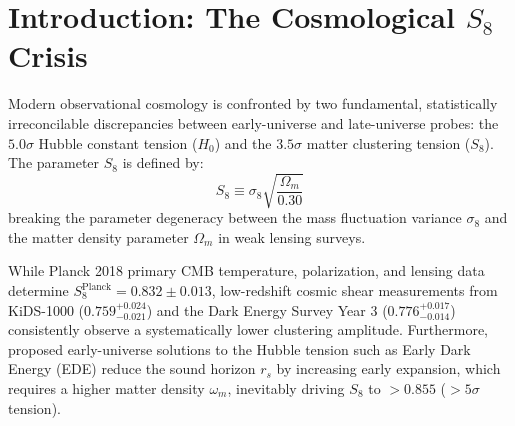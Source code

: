 \documentclass[11pt,a4paper]{article}
\begin{document}
\section{Introduction: The Cosmological $S_8$ Crisis}
Modern observational cosmology is confronted by two fundamental, statistically irreconcilable discrepancies between early-universe and late-universe probes: the $5.0\sigma$ Hubble constant tension ($H_0$) and the $3.5\sigma$ matter clustering tension ($S_8$). The parameter $S_8$ is defined by:
\begin{equation}
S_8 \equiv \sigma_8 \sqrt{\frac{\Omega_m}{0.30}}
\end{equation}
breaking the parameter degeneracy between the mass fluctuation variance $\sigma_8$ and the matter density parameter $\Omega_m$ in weak lensing surveys.

While Planck 2018 primary CMB temperature, polarization, and lensing data determine $S_8^{\mathrm{Planck}} = 0.832 \pm 0.013$, low-redshift cosmic shear measurements from KiDS-1000 ($0.759^{+0.024}_{-0.021}$) and the Dark Energy Survey Year 3 ($0.776^{+0.017}_{-0.014}$) consistently observe a systematically lower clustering amplitude. Furthermore, proposed early-universe solutions to the Hubble tension such as Early Dark Energy (EDE) reduce the sound horizon $r_s$ by increasing early expansion, which requires a higher matter density $\omega_m$, inevitably driving $S_8$ to $> 0.855$ ($> 5\sigma$ tension).
\end{document}
